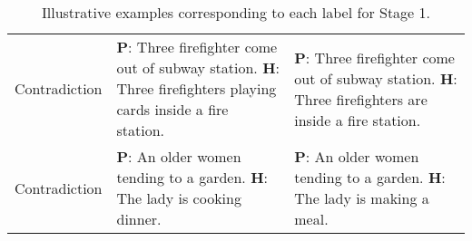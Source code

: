 \begin{table*}[t]
{\begin{tabular}{@{}p{0.12\linewidth}>{\RaggedRight}p{0.44\linewidth}>{\RaggedRight}p{0.44\linewidth}@{}}
        Contradiction & 
        \textbf{P}: Three firefighter come out of subway station.  \newline
        \textbf{H}: Three firefighters playing cards inside a fire station. & 
        
        \textbf{P}: Three firefighter come out of subway station.  \newline
        \textbf{H}: Three firefighters are inside a fire station.\\ 
        
        Contradiction & 
        \textbf{P}: An older women tending to a garden.  \newline
        \textbf{H}: The lady is cooking dinner. & 
        
        \textbf{P}: An older women tending to a garden.  \newline
        \textbf{H}:  The lady is making a meal. \\ 
        
        
    \bottomrule

    \end{tabular}
    }
    \caption{Illustrative examples corresponding to each label for Stage 1.}
    \label{tab:stage1_examples}
\end{table*}